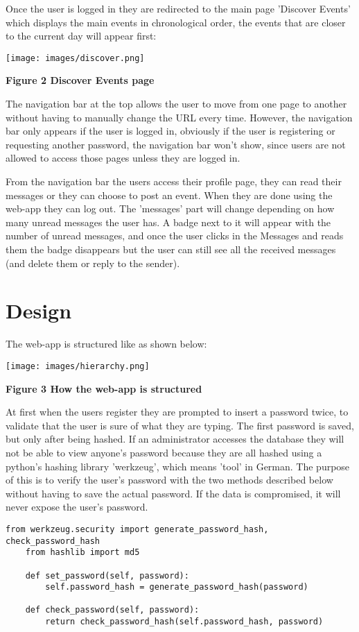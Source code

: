 \documentclass[10pt, a4paper]{article}
\begin{document}
Once the user is logged in they are redirected to the main page 'Discover Events' which displays the main events in chronological order, the events that are closer to the current day will appear first:

    \texttt{[image: images/discover.png]}

    \textbf{Figure 2 Discover Events page}
    \vspace{2mm}

The navigation bar at the top allows the user to move from one page to another without having to manually change the URL every time. However, the navigation bar only appears if the user is logged in, obviously if the user is registering or requesting another password, the navigation bar won't show, since users are not allowed to access those pages unless they are logged in.

From the navigation bar the users access their profile page, they can read their messages or they can choose to post an event. When they are done using the web-app they can log out. The 'messages' part will change depending on how many unread messages the user has. A badge next to it will appear with the number of unread messages, and once the user clicks in the Messages and reads them the badge disappears but the user can still see all the received messages (and delete them or reply to the sender).

    \section{Design}

The web-app is structured like as shown below:

    \texttt{[image: images/hierarchy.png]}

    \textbf{Figure 3 How the web-app is structured}
    \vspace{2mm}

At first when the users register they are prompted to insert a password twice, to validate that the user is sure of what they are typing. The first password is saved, but only after being hashed. If an administrator accesses the database they will not be able to view anyone's password because they are all hashed using a python's hashing library 'werkzeug', which means 'tool' in German. The purpose of this is to verify the user's password with the two methods described below without having to save the actual password. If the data is compromised, it will never expose the user's password.
    \begin{lstlisting}[caption = Hashing passwords]
    from werkzeug.security import generate_password_hash, check_password_hash
    from hashlib import md5

    def set_password(self, password):
        self.password_hash = generate_password_hash(password)

    def check_password(self, password):
        return check_password_hash(self.password_hash, password)
    \end{lstlisting}
\end{document}
